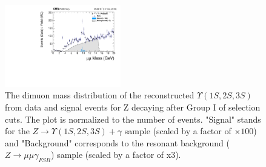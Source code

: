 \begin{figure}[!htbp]
\begin{center}
\includegraphics[width=0.45\textwidth]{figures_and_tables/outputPlots/ZtoUpsilon_Cat0_ZZZZZ/nEvts/data_x_mc/noKinCuts/h_noKin_Upsilon_Mass_Signal_and_Background_LargeRange}\hspace*{1.cm}
\end{center}\vspace*{-.5cm}
\caption{The dimuon mass distribution of the reconstructed $\Upsilon (1S,2S,3S)$ from data and signal events for Z decaying after Group I of selection cuts. The plot is normalized to the number of events. "Signal" stands for the $Z \rightarrow \Upsilon (1S,2S,3S) + \gamma$ sample (scaled by a factor of $\times 100$) and "Background" corresponds to the resonant background ($Z \rightarrow \mu\mu\gamma_{FSR}$) sample (scaled by a factor of x3).}
\label{fig:dimuon_mass_ZtoUpsilon_Cat0}
\end{figure}



